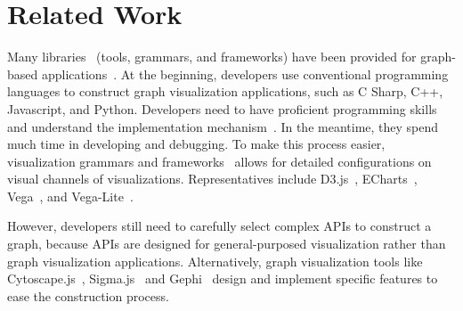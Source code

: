\section{Related Work}

Many libraries~\cite{DBLP:journals/vi/LiMSSZWZC18,mei2020datav,tableau} (tools, grammars, and frameworks) have been provided for graph-based applications~\cite{wang2018graphprotector,pan2020exemplar}.
At the beginning, developers use conventional programming languages to construct graph visualization applications, such as C Sharp, C++, Javascript, and Python. Developers need to have proficient programming skills and understand the implementation mechanism~\cite{reas2003processing,reas2005processing}.
In the meantime, they spend much time in developing and debugging. To make this process easier, visualization grammars and frameworks~\cite{lyra,lyra2,heer2010declarative} allows for detailed configurations on visual channels of visualizations. Representatives include D3.js~\cite{DBLP:journals/tvcg/BostockOH11}, ECharts~\cite{DBLP:journals/vi/LiMSSZWZC18}, Vega~\cite{DBLP:journals/tvcg/SatyanarayanRHH16}, and Vega-Lite~\cite{DBLP:journals/tvcg/SatyanarayanMWH17}.


However, developers still need to carefully select complex APIs to construct a graph, because APIs are designed for general-purposed visualization rather than graph visualization applications. Alternatively, graph visualization tools like Cytoscape.js~\cite{DBLP:journals/bioinformatics/FranzLHDSB16}, Sigma.js~\cite{DBLP:journals/jossw/Coene18} and Gephi~\cite{DBLP:conf/icwsm/BastianHJ09} design and implement specific features to ease the construction process. 


